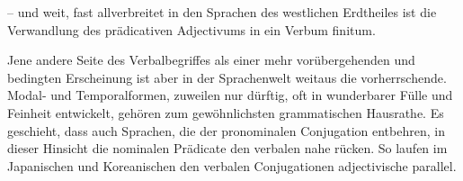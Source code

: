 \noindent – und weit, fast allverbreitet in den Sprachen des westlichen Erdtheiles ist die Verwandlung des prädicativen Adjectivums in ein Verbum finitum.

\label{sp.384}

Jene andere Seite des Verbalbegriffes als einer mehr vorübergehenden und bedingten Erscheinung ist aber in der Sprachenwelt weitaus die vorherrschende. Modal- und Temporalformen, zuweilen nur dürftig, oft in wunderbarer Fülle und Feinheit entwickelt, gehören zum gewöhnlichsten grammatischen Hausrathe. Es geschieht, dass auch Sprachen, die der pronominalen Conjugation entbehren, in dieser Hinsicht die nomi\label{fp.369}nalen Prädicate den verbalen nahe rücken. So laufen im Japanischen und Koreanischen den verbalen Conjugationen adjectivische parallel.

